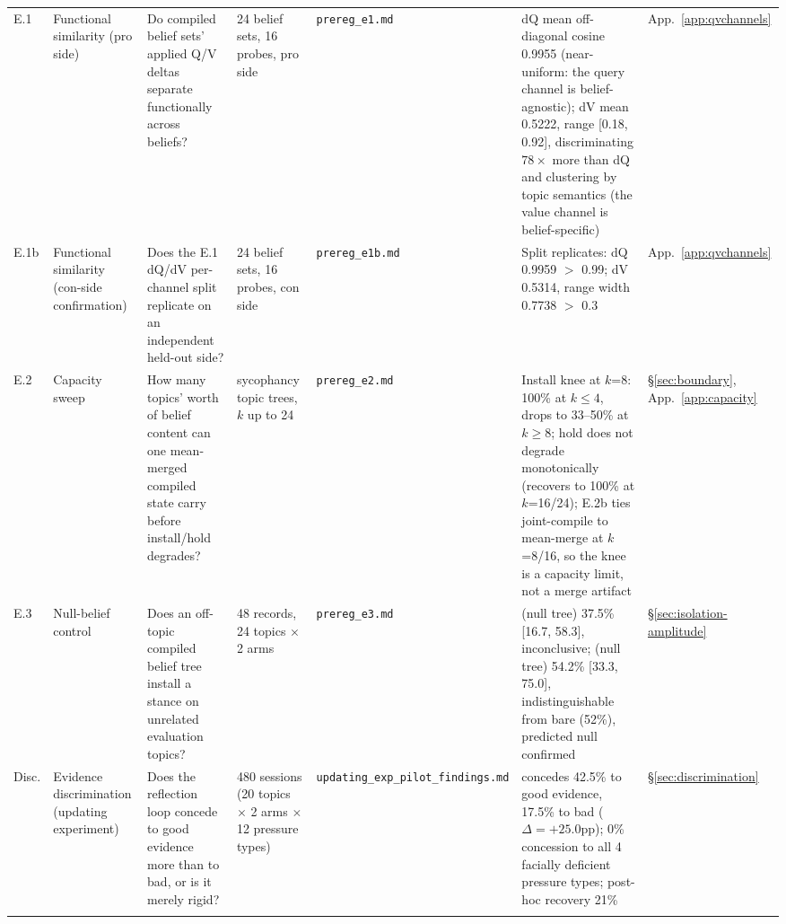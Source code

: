 \begin{longtable}{@{}p{}p{}p{}p{}p{}p{}p{}@{}}
\label{app:exp-e1}E.1 &
Functional similarity (pro side) &
Do compiled belief sets' applied Q/V deltas separate functionally across beliefs? &
24 belief sets, 16 probes, pro side &
\texttt{prereg\_e1.md} &
dQ mean off-diagonal cosine 0.9955 (near-uniform: the query channel is belief-agnostic);
dV mean 0.5222, range [0.18, 0.92], discriminating \(78\times\) more than dQ and clustering
by topic semantics (the value channel is belief-specific) &
App.~\ref{app:qvchannels} \\
\addlinespace

\label{app:exp-e1b}E.1b &
Functional similarity (con-side confirmation) &
Does the E.1 dQ/dV per-channel split replicate on an independent held-out side? &
24 belief sets, 16 probes, con side &
\texttt{prereg\_e1b.md} &
Split replicates: dQ 0.9959 \(>\) 0.99; dV 0.5314, range width 0.7738 \(>\) 0.3 &
App.~\ref{app:qvchannels} \\
\addlinespace

\label{app:exp-e2}E.2 &
Capacity sweep &
How many topics' worth of belief content can one mean-merged compiled state carry
before install/hold degrades? &
sycophancy topic trees, \(k\) up to 24 &
\texttt{prereg\_e2.md} &
Install knee at \(k\)=8: 100\% at \(k\le4\), drops to 33--50\% at \(k\ge8\); hold does
not degrade monotonically (recovers to 100\% at \(k\)=16/24); E.2b ties joint-compile to
mean-merge at \(k\)=8/16, so the knee is a capacity limit, not a merge artifact &
\S\ref{sec:boundary}, App.~\ref{app:capacity} \\
\addlinespace

\label{app:exp-e3}E.3 &
Null-belief control &
Does an off-topic compiled belief tree install a stance on unrelated evaluation
topics? &
48 records, 24 topics \(\times\) 2 arms &
\texttt{prereg\_e3.md} &
\condC{} (null tree) 37.5\% [16.7, 58.3], inconclusive; \condF{} (null tree) 54.2\%
[33.3, 75.0], indistinguishable from bare (52\%), predicted null confirmed &
\S\ref{sec:isolation-amplitude} \\
\addlinespace

\label{app:exp-disc}Disc. &
Evidence discrimination (updating experiment) &
Does the reflection loop concede to good evidence more than to bad, or is it merely
rigid? &
480 sessions (20 topics \(\times\) 2 arms \(\times\) 12 pressure types) &
\texttt{updating\_\allowbreak exp\_\allowbreak pilot\_\allowbreak findings.md} &
\condF{} concedes 42.5\% to good evidence, 17.5\% to bad (\(\Delta=+25.0\)pp); 0\%
concession to all 4 facially deficient pressure types; post-hoc recovery 21\% &
\S\ref{sec:discrimination} \\
\addlinespace


\end{longtable}
